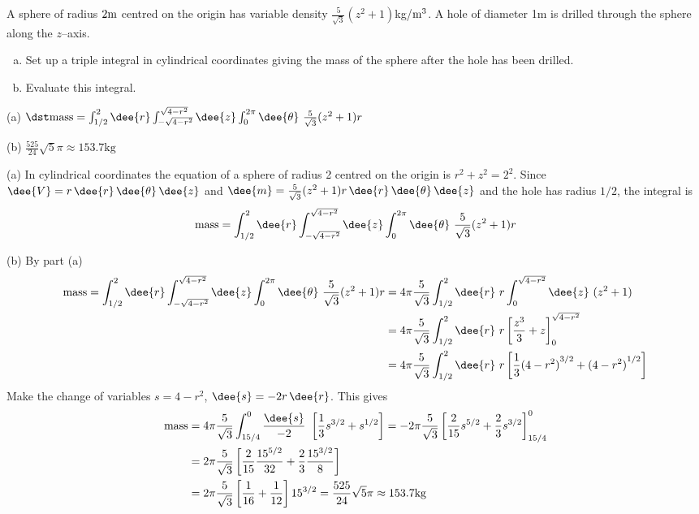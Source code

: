 \begin{question}[M200 2003D] %
A sphere of radius $2{\rm m}$ centred on the origin has variable density 
$\frac{5}{\sqrt{3}}(z^2+1)$kg/${\rm m}^3$. A hole of diameter 1m is drilled
through the sphere along the $z$--axis.
\begin{enumerate}[(a)]
\item
Set up a triple integral in cylindrical coordinates giving
the mass of the sphere after the hole has been drilled.
\item
 Evaluate this integral.
\end{enumerate}
\end{question}


\begin{answer}
(a) $\dst\text{mass} = 
\int_{1/2}^2 \dee{r} \int_{-\sqrt{4-r^2}}^{\sqrt{4-r^2}} \dee{z}\int_0^{2\pi}\dee{\theta}\ 
\frac{5}{\sqrt{3}}(z^2+1)r$

(b) $\frac{525}{24}\sqrt{5}\pi\approx 153.7\text{kg}$
\end{answer}

\begin{solution}
(a) In cylindrical coordinates the equation of a sphere of radius
2 centred on the origin is $r^2+z^2=2^2$. Since 
$\dee{V}=r\, \dee{r}\, \dee{\theta}\, \dee{z}$
and $\dee{m} =\frac{5}{\sqrt{3}}(z^2+1)r\, \dee{r}\, \dee{\theta}\, \dee{z}$ 
and the hole has radius $1/2$, the integral is
\begin{align*}
\text{mass} = 
\int_{1/2}^2 \dee{r} \int_{-\sqrt{4-r^2}}^{\sqrt{4-r^2}} \dee{z}\int_0^{2\pi}\dee{\theta}\ 
\frac{5}{\sqrt{3}}(z^2+1)r
\end{align*}

(b)
By part (a)
\begin{align*}
\text{mass} = 
\int_{1/2}^2 \dee{r} \int_{-\sqrt{4-r^2}}^{\sqrt{4-r^2}} \dee{z}\int_0^{2\pi}\dee{\theta}\ 
\frac{5}{\sqrt{3}}(z^2+1)r
&=4\pi\frac{5}{\sqrt{3}}\int_{1/2}^2\dee{r}\ r\int_0^{\sqrt{4-r^2}}\dee{z}\ (z^2+1) \\
&=4\pi\frac{5}{\sqrt{3}}\int_{1/2}^2\dee{r}\ 
                   r\left[\frac{z^3}{3}+z\right]_0^{\sqrt{4-r^2}} \\
&=4\pi\frac{5}{\sqrt{3}}\int_{1/2}^2\dee{r}\ 
           r\left[\frac{1}{3}{(4-r^2)}^{3/2}+{(4-r^2)}^{1/2}\right] 
\end{align*}
Make the change of variables $s=4-r^2$, $\dee{s}=-2r\,\dee{r}$. This gives
\begin{align*}
\text{mass} &= 4\pi\frac{5}{\sqrt{3}}\int_{15/4}^0\frac{\dee{s}}{-2}\   
                         \left[\frac{1}{3}s^{3/2}+s^{1/2}\right]
= -2\pi\frac{5}{\sqrt{3}} 
\left[\frac{2}{15}s^{5/2}+\frac{2}{3}s^{3/2} \right]_{15/4}^0 \\
&=
2\pi\frac{5}{\sqrt{3}} \left[\frac{2}{15}\frac{15^{5/2}}{32}
+\frac{2}{3}\frac{15^{3/2}}{8}\right] \\
&=2\pi\frac{5}{\sqrt{3}} \left[\frac{1}{16}+\frac{1}{12}\right]15^{3/2}
=\frac{525}{24}\sqrt{5}\pi\approx 153.7\text{kg}
\end{align*}
\end{solution}

